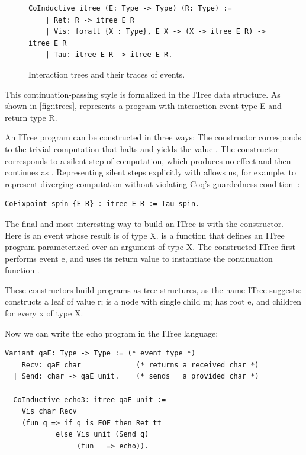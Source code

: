 \begin{figure}
  \begin{lstlisting}[style=customcoq]
    CoInductive itree (E: Type -> Type) (R: Type) :=
    | Ret: R -> itree E R
    | Vis: forall {X : Type}, E X -> (X -> itree E R) -> itree E R
    | Tau: itree E R -> itree E R.
  \end{lstlisting}
  \caption{Interaction trees and their traces of events.}
  \label{fig:itrees}
\end{figure}

This continuation-passing style is formalized in the ITree data structure.  As
shown in \autoref{fig:itrees},  represents a program with
interaction event type \ilc E and return type \ilc R.

An ITree program can be constructed in three ways: The  constructor
corresponds to the trivial computation that halts and yields the value .
The  constructor corresponds to a silent step of computation, which
produces no effect and then continues as .  Representing silent steps
explicitly with  allows us, for example, to represent diverging
computation without violating Coq's guardedness condition~\cite{coinduction}:
\begin{lstlisting}[style=customcoq]
CoFixpoint spin {E R} : itree E R := Tau spin.
\end{lstlisting}

The final and most interesting way to build an ITree is with the  constructor.  Here  is an event whose result is of type \ilc
X.   is a function that defines an ITree program parameterized over an
argument of type \ilc X.  The constructed ITree first performs event \ilc e, and
uses its return value  to instantiate the continuation function
.

These constructors build programs as tree structures, as the name ITree
suggests:  constructs a leaf of value \ilc r;  is a
node with single child \ilc m;  has root \ilc e, and children
 for every \ilc x of type \ilc X.

Now we can write the echo program in the ITree language:
\begin{lstlisting}[style=customcoq]
  Variant qaE: Type -> Type := (* event type *)
    Recv: qaE char             (* returns a received char *)
  | Send: char -> qaE unit.    (* sends   a provided char *)

  CoInductive echo3: itree qaE unit :=
    Vis char Recv
    (fun q => if q is EOF then Ret tt
            else Vis unit (Send q)
                 (fun _ => echo)).
\end{lstlisting}

